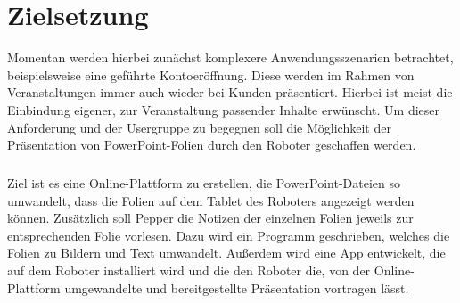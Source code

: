 \section{Zielsetzung}\label{sec:zielsetzung}
Momentan werden hierbei zunächst komplexere Anwendungsszenarien betrachtet,
beispielsweise eine geführte Kontoeröffnung. Diese werden im Rahmen von
Veranstaltungen immer auch wieder bei Kunden präsentiert. Hierbei ist meist die
Einbindung eigener, zur Veranstaltung passender Inhalte erwünscht. Um dieser
Anforderung und der Usergruppe zu begegnen soll die Möglichkeit der
Präsentation von PowerPoint-Folien durch den Roboter geschaffen werden.

\subparagraph{}
Ziel ist es eine Online-Plattform zu erstellen, die PowerPoint-Dateien so
umwandelt, dass die Folien auf dem Tablet des Roboters angezeigt werden können.
Zusätzlich soll Pepper die Notizen der einzelnen Folien jeweils zur
entsprechenden Folie vorlesen. Dazu wird ein Programm geschrieben, welches die
Folien zu Bildern und Text umwandelt. Außerdem wird eine App entwickelt, die auf
dem Roboter installiert wird und die den Roboter die, von der Online-Plattform
umgewandelte und bereitgestellte Präsentation vortragen lässt.
